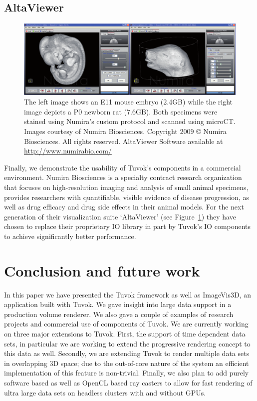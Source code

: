 \subsection{AltaViewer}

\begin{figure}
	\includegraphics[width=\linewidth]{images/arch/altaviewer}

	\caption{The left image shows an E11 mouse embryo
	(2.4GB) while the right image depicts a P0 newborn rat
	(7.6GB). Both specimens were stained using Numira's custom
	protocol and scanned using microCT. Images courtesy
	of Numira Biosciences. Copyright 2009 \copyright{} Numira Biosciences.
	All rights reserved. AltaViewer Software available
	at \url{http://www.numirabio.com/}}
	\label{figtvk:altaviewer}
\end{figure}

Finally, we demonstrate the usability of Tuvok's components
in a commercial environment. Numira Biosciences is a specialty
contract research organization that focuses
on high-resolution imaging and analysis of small animal
specimens, provides researchers with quantifiable, visible
evidence of disease progression, as well as drug efficacy and
drug side effects in their animal models. For the next generation
of their visualization suite `AltaViewer' (see
Figure~\ref{figtvk:altaviewer}) they have chosen to replace their
proprietary IO library in part by Tuvok's IO components to achieve
significantly better performance.

\section{Conclusion and future work}

In this paper we have presented the Tuvok framework as well
as ImageVis3D, an application built with Tuvok. We gave insight
into large data support in a production volume renderer.
We also gave a couple of examples of research projects and
commercial use of components of Tuvok.
We are currently working on three major extensions to
Tuvok. First, the support of time dependent data sets, in
particular we are working to extend the progressive rendering
concept to this data as well. Secondly, we are extending
Tuvok to render multiple data sets in overlapping 3D space;
due to the out-of-core nature of the system an efficient
implementation of this feature is non-trivial. Finally, we also
plan to add purely software based as well as OpenCL based
ray casters to allow for fast rendering of ultra large data sets
on headless clusters with and without GPUs.
